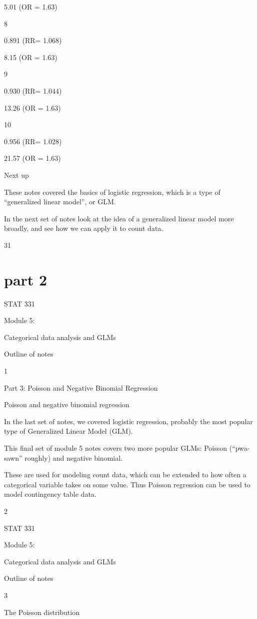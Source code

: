 \documentclass[
  letterpaper,
  DIV=11,
  numbers=noendperiod]{scrreprt}
\begin{document}
5.01 (OR = 1.63)

8

0.891 (RR= 1.068)

8.15 (OR = 1.63)

9

0.930 (RR= 1.044)

13.26 (OR = 1.63)

10

0.956 (RR= 1.028)

21.57 (OR = 1.63)

Next up

These notes covered the basics of logistic regression, which is a type
of ``generalized linear model'', or GLM.

In the next set of notes look at the idea of a generalized linear model
more broadly, and see how we can apply it to count data.

31

\hypertarget{part-2-1}{%
\section{part 2}\label{part-2-1}}

STAT 331

Module 5:

Categorical data analysis and GLMs

Outline of notes

1

Part 3: Poisson and Negative Binomial Regression

Poisson and negative binomial regression

In the last set of notes, we covered logistic regression, probably the
most popular type of Generalized Linear Model (GLM).

This final set of module 5 notes covers two more popular GLMs: Poisson
(``pwa-sawn'' roughly) and negative binomial.

These are used for modeling count data, which can be extended to how
often a categorical variable takes on some value. Thus Poisson
regression can be used to model contingency table data.

2

STAT 331

Module 5:

Categorical data analysis and GLMs

Outline of notes

3

The Poisson distribution
\end{document}
